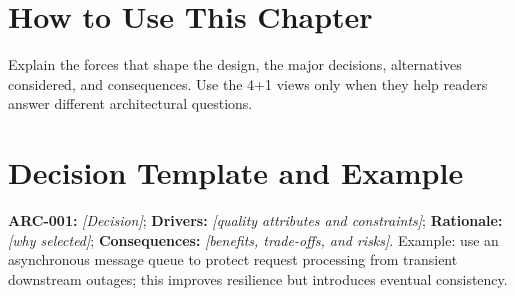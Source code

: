 \section{How to Use This Chapter}
Explain the forces that shape the design, the major decisions, alternatives considered, and consequences. Use the 4+1 views only when they help readers answer different architectural questions.
\section{Decision Template and Example}
\textbf{ARC-001:} \textit{[Decision]}; \textbf{Drivers:} \textit{[quality attributes and constraints]}; \textbf{Rationale:} \textit{[why selected]}; \textbf{Consequences:} \textit{[benefits, trade-offs, and risks]}. Example: use an asynchronous message queue to protect request processing from transient downstream outages; this improves resilience but introduces eventual consistency.
